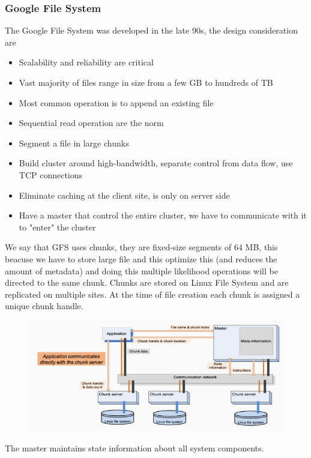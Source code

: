 \subsubsection{Google File System}
The Google File System was developed in the late 90s, the design consideration are
\begin{itemize}
    \item Scalability and reliability are critical
    \item Vast majority of files range in size from a few GB to hundreds of TB
    \item Most common operation is to append an existing file 
    \item Sequential read operation are the norm
    \item Segment a file in large chunks 
    \item Build cluster around high-bandwidth, separate control from data flow, use TCP connections 
    \item Eliminate caching at the client site, is only on server side
    \item Have a master that control the entire cluster, we have to communicate with it to "enter" the cluster
\end{itemize}
We say that GFS uses chunks, they are fixed-size segments of 64 MB, this beacuse we have to store large file and this optimize this (and reduces the amount of metadata) and doing this multiple likelihood operations will be directed to the same chunk. Chunks are stored on Linux File System and are replicated on multiple sites. At the time of file creation each chunk is assigned a unique chunk handle.

\begin{figure}[h!]
    \centering
    \includegraphics[scale=0.35]{images/GFS arch.png}
\end{figure}

The master maintains state information about all system components.

